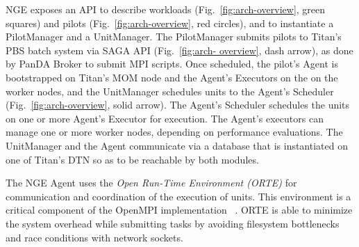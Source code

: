 NGE exposes an API to describe workloads (Fig.~\ref{fig:arch-overview}, green
squares) and pilots (Fig.~\ref{fig:arch-overview}, red circles), and to
instantiate a PilotManager and a UnitManager.   The PilotManager submits
pilots to Titan's PBS  batch system via SAGA API (Fig.~\ref{fig:arch-
overview}, dash arrow), as done by PanDA Broker to submit MPI scripts. Once
scheduled, the pilot's Agent is bootstrapped on Titan's MOM node and the
Agent's Executors on the on the worker nodes, and the UnitManager schedules
units to the Agent's Scheduler (Fig.~\ref{fig:arch-overview}, solid arrow).
The Agent's Scheduler schedules the units on one or more Agent's Executor for
execution. The Agent's executors can manage one or more worker nodes,
depending on performance evaluations. The UnitManager and the Agent
communicate via a database that is instantiated on one of Titan's DTN so as to
be reachable by both modules.

The NGE Agent uses the \emph{Open Run-Time Environment (ORTE)} for
communication and coordination of the execution of units. This environment is
a critical component of the OpenMPI implementation ~\cite{castain05:_open_rte,
cug-2016}. ORTE is able to minimize the system overhead while submitting tasks
by avoiding filesystem bottlenecks and race conditions with network sockets.


